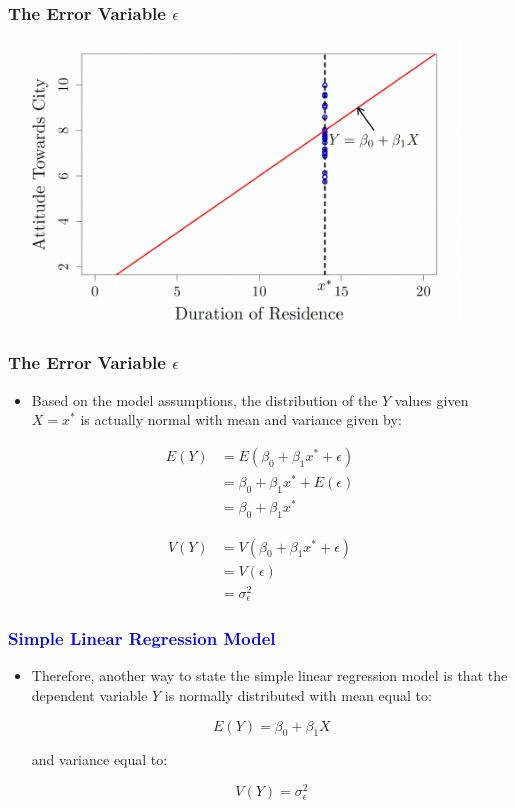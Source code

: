 \documentclass[12pt]{beamer}
\begin{document}
\begin{frame}
	\frametitle{\color{blue}The Error Variable $\epsilon$}
	\centering
	\includegraphics[width=12cm]{error2.png}
	
\end{frame}
\begin{frame}
	\frametitle{The Error Variable $\epsilon$}
	
	\begin{itemize}[label={\color{blue}$\blacktriangleright$}]
		\item Based on the model assumptions, the distribution of the $Y$ values given $X = x^*$ is actually normal with mean and variance given by:

	\end{itemize}
		\begin{align*}
		E(Y) &= E(\beta_0 + \beta_1x^* + \epsilon) \\
		&= \beta_0 + \beta_1x^* + E(\epsilon) \\
		&= \beta_0 + \beta_1x^*
	\end{align*}
	
	\begin{align*}
		V(Y) &= V(\beta_0 + \beta_1x^* + \epsilon) \\
		&= V(\epsilon) \\
		&= \sigma_\epsilon^2
	\end{align*}
\end{frame}
\begin{frame}
	\frametitle{\textcolor{blue}{Simple Linear Regression Model}}
	
	\begin{itemize}[label={\color{blue}$\blacktriangleright$}]
		\item Therefore, another way to state the simple linear regression model is that the dependent variable $Y$ is normally distributed with mean equal to:
		
		\[
		E(Y) = \beta_0 + \beta_1X
		\]
		
		and variance equal to:
		
		\[
		V(Y) = \sigma_\epsilon^2
		\]
	\end{itemize}
	
\end{frame}
\end{document}
